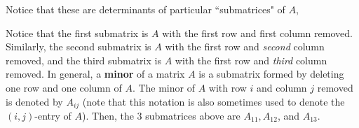 \documentclass[letterpaper,12pt]{article}
\begin{document}
Notice that these are determinants of particular ``submatrices" of $A$,

\begin{figure}[H]
    \centering
    \def\svgwidth{0.6\linewidth}
    
\end{figure}

Notice that the first submatrix is $A$ with the first row and first column removed. Similarly, the second submatrix is $A$ with the first row and \textit{second} column removed, and the third submatrix is $A$ with the first row and \textit{third} column removed. In general, a \textbf{minor} of a matrix $A$ is a submatrix formed by deleting one row and one column of $A$. The minor of $A$ with row $i$ and column $j$ removed is denoted by $A_{ij}$ (note that this notation is also sometimes used to denote the $(i,j)$-entry of $A$). Then, the 3 submatrices above are $A_{11}, A_{12}$, and $A_{13}$.
\end{document}
